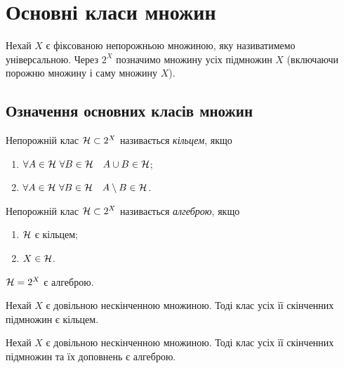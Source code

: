 \chapter{Основні класи множин}
\label{sec-1}

Нехай $X$ є фіксованою непорожньою множиною, яку називатимемо універсальною. Через $2^X$ позначимо множину усіх підмножин $X$ (включаючи порожню множину і саму множину $X$). 


\section{Означення основних класів множин}



\begin{definition}
	\label{def-1-1}
	Непорожній клас $\mathcal H\subset 2^X$ називається \emph{кільцем}, якщо
	\begin{enumerate}[label={\upshape (\roman*)}]
		\item \label{def-1-1-i}
		$\forall A\in\mathcal H\ \forall B\in\mathcal H\quad A\cup B\in\mathcal H $;
		\item \label{def-1-1-ii}
		$\forall A\in\mathcal H\ \forall B\in\mathcal H\quad A\setminus B\in\mathcal H $.
	\end{enumerate}
\end{definition}

\begin{definition}
	\label{def-1-2}
	Непорожній клас $\mathcal H\subset 2^X$ називається \emph{алгеброю}, якщо
	\begin{enumerate}[label={\upshape (\roman*)}]
		\item \label{def-1-2-i}
		$\mathcal H $ є кільцем;
		\item \label{def-1-2-ii}
		$X\in\mathcal H $.
	\end{enumerate}
\end{definition}

\begin{example}
	\label{ex-1-1}
	$\mathcal H=2^X$ є алгеброю.
\end{example}

\begin{example}
	\label{ex-1-2}
	Нехай $X$ є довільною нескінченною множиною. Тоді клас усіх її скінченних підмножин є кільцем.
\end{example}

\begin{example}
	\label{ex-1-3}
	Нехай $X$ є довільною нескінченною множиною. Тоді клас усіх її скінченних підмножин  та їх доповнень  є алгеброю.
\end{example}


